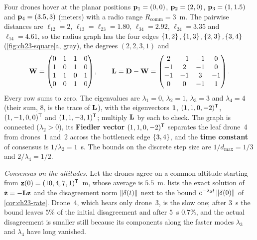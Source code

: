 \begin{example}
\label{ex:ch23-square}
Four drones hover at the planar positions
$\mathbf{p}_1 = (0, 0)$, $\mathbf{p}_2 = (2, 0)$, $\mathbf{p}_3 = (1, 1.5)$ and
$\mathbf{p}_4 = (3.5, 3)$ (meters) with a radio range $R_{\mathrm{comm}} = 3$~m.
The pairwise distances are $\ell_{12} = 2$, $\ell_{13} = \ell_{23} = 1.80$,
$\ell_{34} = 2.92$, $\ell_{24} = 3.35$ and $\ell_{14} = 4.61$, so the radius
graph has the four edges $\left\{ 1,2 \right\}, \left\{ 1,3 \right\}, \left\{ 2,3 \right\}, \left\{ 3,4 \right\}$
(\cref{fig:ch23-square}a, gray), the degrees $(2, 2, 3, 1)$ and
\[
  \mathbf{W} = \begin{pmatrix} 0&1&1&0\\ 1&0&1&0\\ 1&1&0&1\\ 0&0&1&0 \end{pmatrix}, \qquad
  \mathbf{L} = \mathbf{D} - \mathbf{W} = \begin{pmatrix} 2&-1&-1&0\\ -1&2&-1&0\\ -1&-1&3&-1\\ 0&0&-1&1 \end{pmatrix}.
\]
Every row sums to zero. The eigenvalues are $\lambda_1 = 0$, $\lambda_2 = 1$,
$\lambda_3 = 3$ and $\lambda_4 = 4$ (their sum, $8$, is the trace of
$\mathbf{L}$), with the eigenvectors $\mathbf{1}$, $(1, 1, 0, -2)^{\mathsf{T}}$,
$(1, -1, 0, 0)^{\mathsf{T}}$ and $(1, 1, -3, 1)^{\mathsf{T}}$; multiply $\mathbf{L}$ by each to check.
The graph is connected ($\lambda_2 > 0$), its \textbf{Fiedler vector}
$(1, 1, 0, -2)^{\mathsf{T}}$ separates the leaf drone~4 from drones~1 and~2 across the
bottleneck edge $\left\{ 3,4 \right\}$, and the \textbf{time constant}
of consensus is $1/\lambda_2 = 1$~s. The bounds on the discrete step size are
$1/d_{\max} = 1/3$ and $2/\lambda_4 = 1/2$.

\emph{Consensus on the altitudes.} Let the drones agree on a common altitude
starting from $\mathbf{z}(0) = (10, 4, 7, 1)^{\mathsf{T}}$~m, whose average is $5.5$~m.
 lists the exact solution of $\dot{\mathbf{z}} =
-\mathbf{L}\mathbf{z}$ and the disagreement norm $\left\lVert \mathbf{\delta}(t) \right\rVert$ next to
the bound $e^{-\lambda_2 t}\left\lVert \mathbf{\delta}(0) \right\rVert$ of
\cref{cor:ch23-rate}. Drone~4, which hears only drone~3, is the slow one; after
$3$~s the bound leaves $5\%$ of the initial disagreement and after $5$~s
$0.7\%$, and the actual disagreement is smaller still because its components
along the faster modes $\lambda_3$ and $\lambda_4$ have long vanished.


\end{example}
